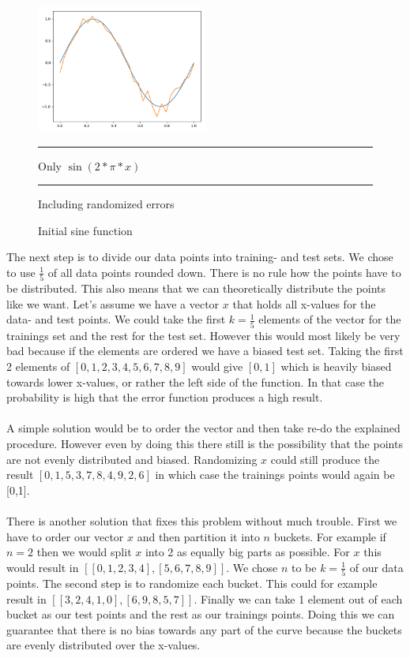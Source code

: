 \documentclass{article}
\newcommand{\sqboxs}{1.2ex}%
\newcommand{\sqbox}[1]{\textcolor{#1}{\rule{\sqboxs}{\sqboxs}}}
\begin{document}
	\begin{figure} %
		\centering
		\includegraphics[width=0.5\textwidth]{plots/sine5.png}
		\caption{Initial sine function}
		\sqbox{clightblue} Only $\sin(2*\pi*x)$\\
		\sqbox{corange} Including randomized errors
		\label{plot:sine5}
	\end{figure}
	
	
	
	The next step is to divide our data points into training- and test sets. We chose to use $\frac{1}{5}$ of all data points rounded down. There is no rule how the points have to be distributed. This also means that we can theoretically distribute the points like we want. Let's assume we have a vector $x$ that holds all x-values for the data- and test points. We could take the first $k = \frac{1}{5}$ elements of the vector for the trainings set and the rest for the test set. However this would most likely be very bad because if the elements are ordered we have a biased test set. Taking the first 2 elements of $[0,1,2,3,4,5,6,7,8,9]$ would give $[0,1]$ which is heavily biased towards lower x-values, or rather the left side of the function. In that case the probability is high that the error function produces a high result.\\
	\\
	A simple solution would be to order the vector and then take re-do the explained procedure. However even by doing this there still is the possibility that the points are not evenly distributed and biased. Randomizing $x$ could still produce the result $[0,1,5,3,7,8,4,9,2,6]$ in which case the trainings points would again be [0,1]. \\
	\\
	There is another solution that fixes this problem without much trouble. First we have to order our vector $x$ and then partition it into $n$ buckets. For example if $n = 2$ then we would split $x$ into 2 as equally big parts as possible. For $x$ this would result in $[[0,1,2,3,4],[5,6,7,8,9]]$. We chose $n$ to be $k = \frac{1}{5}$ of our data points. The second step is to randomize each bucket. This could for example result in $[[3,2,4,1,0],[6,9,8,5,7]]$. Finally we can take 1 element out of each bucket as our test points and the rest as our trainings points. Doing this we can guarantee that there is no bias towards any part of the curve because the buckets are evenly distributed over the x-values.
	
\end{document}
